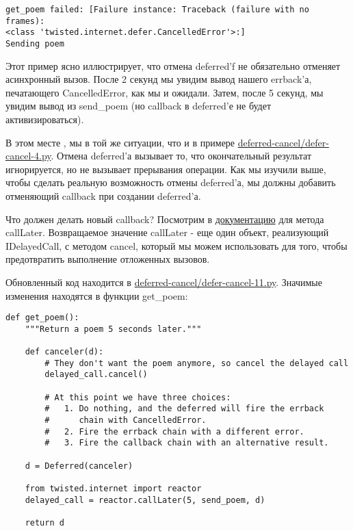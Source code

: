  \begin{verbatim}
get_poem failed: [Failure instance: Traceback (failure with no frames): 
<class 'twisted.internet.defer.CancelledError'>:]
Sending poem
\end{verbatim} 


Этот пример ясно иллюстрирует, что отмена deferred'f 
не обязательно отменяет асинхронный вызов. После 2 
секунд мы увидим вывод нашего errback'а, печатающего 
CancelledError, как мы и ожидали. Затем, после 5 секунд, 
мы увидим вывод из send\_poem (но callback в deferred'е не 
будет активизироваться).


В этом месте , мы в той же ситуации, что и в примере 
\href{http://github.com/jdavisp3/twisted-intro/blob/master/deferred-cancel/defer-cancel-4.py#L1}{deferred-cancel/defer-cancel-4.py}. Отмена deferred'а вызывает то, что окончательный 
результат игнорируется, но не вызывает прерывания операции. Как мы 
изучили выше, чтобы сделать реальную возможность 
отмены deferred'а, мы должны добавить отменяющий callback при 
создании deferred'а.


Что должен делать новый callback? Посмотрим в 
\href{http://twistedmatrix.com/trac/browser/tags/releases/twisted-10.1.0/twisted/internet/interfaces.py#L556}{документацию} для 
метода callLater. Возвращаемое значение callLater - еще 
один объект, реализующий IDelayedCall, с методом 
cancel, который мы можем использовать для того, чтобы 
предотвратить выполнение отложенных вызовов.


Обновленный код находится в \href{http://github.com/jdavisp3/twisted-intro/blob/master/deferred-cancel/defer-cancel-11.py#L1}{deferred-cancel/defer-cancel-11.py}. Значимые изменения находятся в 
функции get\_poem:

 \begin{verbatim}
def get_poem():
    """Return a poem 5 seconds later."""

    def canceler(d):
        # They don't want the poem anymore, so cancel the delayed call
        delayed_call.cancel()

        # At this point we have three choices:
        #   1. Do nothing, and the deferred will fire the errback
        #      chain with CancelledError.
        #   2. Fire the errback chain with a different error.
        #   3. Fire the callback chain with an alternative result.

    d = Deferred(canceler)

    from twisted.internet import reactor
    delayed_call = reactor.callLater(5, send_poem, d)

    return d
\end{verbatim} 


